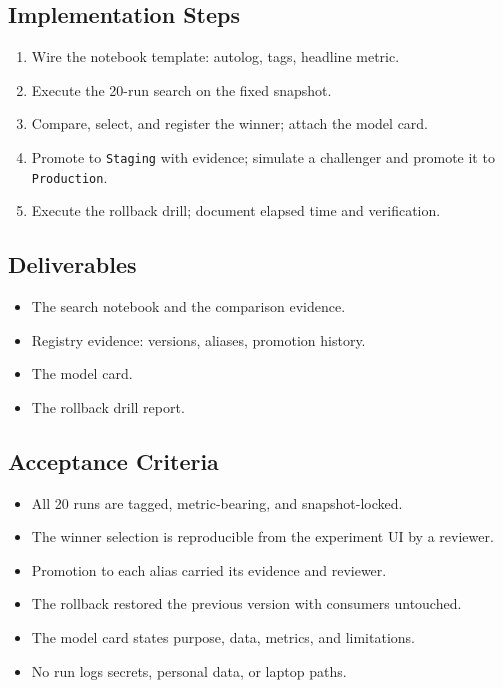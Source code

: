 \subsection*{Implementation Steps}
\begin{enumerate}
    \item Wire the notebook template: autolog, tags, headline metric.
    \item Execute the 20-run search on the fixed snapshot.
    \item Compare, select, and register the winner; attach the model card.
    \item Promote to \texttt{Staging} with evidence; simulate a challenger and promote it to \texttt{Production}.
    \item Execute the rollback drill; document elapsed time and verification.
\end{enumerate}

\subsection*{Deliverables}
\begin{itemize}
    \item The search notebook and the comparison evidence.
    \item Registry evidence: versions, aliases, promotion history.
    \item The model card.
    \item The rollback drill report.
\end{itemize}

\subsection*{Acceptance Criteria}
\begin{itemize}
    \item[\(\square\)] All 20 runs are tagged, metric-bearing, and snapshot-locked.
    \item[\(\square\)] The winner selection is reproducible from the experiment UI by a reviewer.
    \item[\(\square\)] Promotion to each alias carried its evidence and reviewer.
    \item[\(\square\)] The rollback restored the previous version with consumers untouched.
    \item[\(\square\)] The model card states purpose, data, metrics, and limitations.
    \item[\(\square\)] No run logs secrets, personal data, or laptop paths.
\end{itemize}

